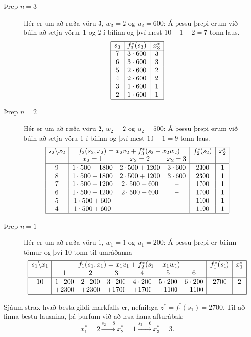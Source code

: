 \begin{lausn}
\begin{description}
  \item[Þrep $n=3$] Hér er um að ræða vöru 3, $w_3=2$ og $u_3=600$: Á þessu þrepi erum við búin að setja vörur 1 og 2 í bílinn og því mest $10-1-2=7$ tonn laus.
  \[\begin{array}{|c|c|c|}\hline 
    s_3 & f_3^*(s_3) & x_3^* \\ \hline 
    7	& 3\cdot600 & 3 \\
    6	& 3\cdot600 & 3 \\
    5	& 2\cdot600 & 2 \\
    4	& 2\cdot600 & 2 \\
    3	& 1\cdot600 & 1 \\
    2	& 1\cdot600 & 1 \\    \hline
    \end{array}\]
  \item[Þrep $n=2$] Hér er um að ræða vöru 2, $w_2=2$ og $u_2=500$: Á þessu þrepi erum við búin að setja vöru 1 í bílinn og því mest $10-1=9$ tonn laus.
  \[\begin{array}{|c|ccc|c|c|}\hline 
    s_2\backslash x_2 & \multicolumn{3}{c|}{f_2(s_2,x_2)=x_2u_2+f^*_3(s_2-x_2w_2)} &f_2^*(s_2)&  x_2^* \\ 
	& x_2=1	&	x_2=2	&	x_2=3	&	&	\\\hline 
    9	& 1\cdot500+1800 	& 2\cdot500+1200 	& 3\cdot600 	&2300	&	1\\
    8	& 1\cdot500+1800 	& 2\cdot500+1200 	& 3\cdot600 	&2300	&	1\\    
    7	& 1\cdot500+1200 	& 2\cdot500+600 	& - 		&1700	&	1\\
    6	& 1\cdot500+1200 	& 2\cdot500+600 	& -		&1700	&	1\\
    5	& 1\cdot500+600 	& - 			& - 		&1100	&	1\\
    4	& 1\cdot500+600 	& -			& - 		&1100	&	1\\
    \hline
    \end{array}\]
  \item[Þrep $n=1$] Hér er um að ræða vöru 1, $w_1=1$ og $u_1=200$: Á þessu þrepi er bílinn tómur og því 10 tonn til umráðanna
  \[\begin{array}{|c|cccccc|c|c|}\hline 
    s_1\backslash x_1 & \multicolumn{6}{c|}{f_1(s_1,x_1)=x_1u_1+f^*_2(s_1-x_1w_1)} &f_1^*(s_1)&  x_1^* \\ 
	& 1 & 2 & 3&4&5&6&&	\\\hline 
    10	& 1\cdot200	&2\cdot200	&3\cdot200&4\cdot200&5\cdot200&6\cdot200& 2700	&	2\\
    	& +2300 	&+2300		&+1700&+1700&+1100&+1100& &	\\
    \hline
    \end{array}\]
\end{description}
Sjáum strax hvað besta gildi markfalls er, nefnilega $z^*=f_1^*(s_1)=2700$. Til að finna bestu lausnina, þá þurfum við að lesa hana afturábak: $$x_1^*=2 \stackrel{s_2=8}{\longrightarrow} x_2^*=1\stackrel{s_3=6}{\longrightarrow} x_3^*=3.$$
\end{lausn}

